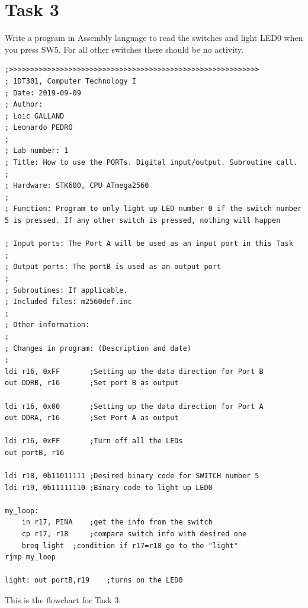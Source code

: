 \documentclass[a4paper,12pt]{article}
\begin{document}
\section{Task 3}
Write a program in Assembly language to read the switches and light LED0 when you
press SW5.
For all other switches there should be no activity.

\lstset{style=Asm}
\begin{lstlisting}
;>>>>>>>>>>>>>>>>>>>>>>>>>>>>>>>>>>>>>>>>>>>>>>>>>>>>>>>>>>>
; 1DT301, Computer Technology I
; Date: 2019-09-09
; Author:
; Loic GALLAND
; Leonardo PEDRO
;
; Lab number: 1
; Title: How to use the PORTs. Digital input/output. Subroutine call.
;
; Hardware: STK600, CPU ATmega2560
;
; Function: Program to only light up LED number 0 if the switch number 5 is pressed. If any other switch is pressed, nothing will happen

; Input ports: The Port A will be used as an input port in this Task
;
; Output ports: The portB is used as an output port
;
; Subroutines: If applicable.
; Included files: m2560def.inc
;
; Other information:
;
; Changes in program: (Description and date)
;
ldi r16, 0xFF 		;Setting up the data direction for Port B
out DDRB, r16 		;Set port B as output

ldi r16, 0x00 		;Setting up the data direction for Port A
out DDRA, r16 		;Set Port A as output

ldi r16, 0xFF		;Turn off all the LEDs
out portB, r16

ldi r18, 0b11011111	;Desired binary code for SWITCH number 5
ldi r19, 0b11111110	;Binary code to light up LED0

my_loop:
	in r17, PINA 	;get the info from the switch
	cp r17, r18 	;compare switch info with desired one 
	breq light 	;condition if r17=r18 go to the "light"
rjmp my_loop

light: out portB,r19	;turns on the LED0
\end{lstlisting}
\newpage
This is the flowchart for Task 3:
\end{document}
